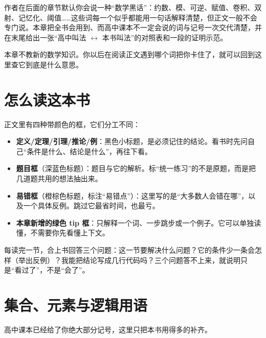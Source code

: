 \documentclass[UTF8,a4paper,11pt,twoside,openright,fontset=fandol]{ctexbook}
\theoremstyle{definition}
\begin{document}
\begin{tip}[这一章解决什么问题]
作者在后面的章节默认你会说一种“数学黑话”：约数、模、可逆、赋值、卷积、双射、记忆化、阈值……这些词每一个似乎都能用一句话解释清楚，但正文一般不会专门说。本章把全书会用到、而高中课本不一定会说的词与记号一次交代清楚，并在末尾给出一张“高中叫法 $\leftrightarrow$ 本书叫法”的对照表和一段的证明示范。

本章不教新的数学知识。你以后在阅读正文遇到哪个词把你卡住了，就可以回到这里查它到底是什么意思。
\end{tip}

\section{怎么读这本书}


正文里有四种带颜色的框，它们分工不同：

\begin{itemize}
\item \textbf{定义/定理/引理/推论/例}：黑色小标题，是必须记住的结论。看书时先问自己“条件是什么、结论是什么”，再往下看。
\item \textbf{题目框}（深蓝色标题）：题目与它的解析。标“统一练习”的不是原题，而是把几道题共用的想法抽出来。
\item \textbf{易错框}（橙棕色标题，标注“易错点”）：这里写的是“大多数人会错在哪”，以及一个具体反例。跳过它最省时间，也最亏。
\item \textbf{本章新增的绿色 tip 框}：只解释一个词、一步跳步或一个例子。它可以单独读懂，不需要你先看懂上下文。
\end{itemize}

\begin{tip}[一句话学习方法]
每读完一节，合上书回答三个问题：这一节要解决什么问题？它的条件少一条会怎样（举出反例）？我能把结论写成几行代码吗？三个问题答不上来，就说明只是“看过了”，不是“会了”。
\end{tip}

\section{集合、元素与逻辑用语}
高中课本已经给了你绝大部分记号，这里只把本书用得多的补齐。
\end{document}
